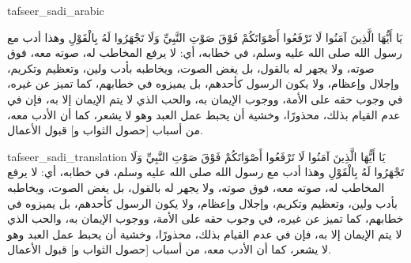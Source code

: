\begin{taggedblock}{tafseer_sadi_arabic}
\begin{Arabic}
{ يَا أَيُّهَا الَّذِينَ آمَنُوا لَا تَرْفَعُوا أَصْوَاتَكُمْ فَوْقَ صَوْتِ النَّبِيِّ وَلَا تَجْهَرُوا لَهُ بِالْقَوْلِ }
وهذا أدب مع رسول الله صلى الله عليه وسلم، في خطابه، أي: لا يرفع المخاطب له، صوته معه، فوق صوته، ولا يجهر له بالقول، بل يغض الصوت، ويخاطبه بأدب ولين، وتعظيم وتكريم، وإجلال وإعظام، ولا يكون الرسول كأحدهم، بل يميزوه في خطابهم، كما تميز عن غيره، في وجوب حقه على الأمة، ووجوب الإيمان به، والحب الذي لا يتم الإيمان إلا به، فإن في عدم القيام بذلك، محذورًا، وخشية أن يحبط عمل العبد وهو لا يشعر، كما أن الأدب معه، من أسباب
[حصول الثواب و]
قبول الأعمال.
\end{Arabic}
\end{taggedblock}
\begin{taggedblock}{tafseer_sadi_translation}
{ يَا أَيُّهَا الَّذِينَ آمَنُوا لَا تَرْفَعُوا أَصْوَاتَكُمْ فَوْقَ صَوْتِ النَّبِيِّ وَلَا تَجْهَرُوا لَهُ بِالْقَوْلِ }
وهذا أدب مع رسول الله صلى الله عليه وسلم، في خطابه، أي: لا يرفع المخاطب له، صوته معه، فوق صوته، ولا يجهر له بالقول، بل يغض الصوت، ويخاطبه بأدب ولين، وتعظيم وتكريم، وإجلال وإعظام، ولا يكون الرسول كأحدهم، بل يميزوه في خطابهم، كما تميز عن غيره، في وجوب حقه على الأمة، ووجوب الإيمان به، والحب الذي لا يتم الإيمان إلا به، فإن في عدم القيام بذلك، محذورًا، وخشية أن يحبط عمل العبد وهو لا يشعر، كما أن الأدب معه، من أسباب
[حصول الثواب و]
قبول الأعمال.
\end{taggedblock}

\begin{comment}
Please use the following for footnotes:- Sample\footnoteQ{Text of Qur'an footnote goes here.}.
Sample\footnoteT{Text of Tafseer footnote goes here.}.
\end{comment}